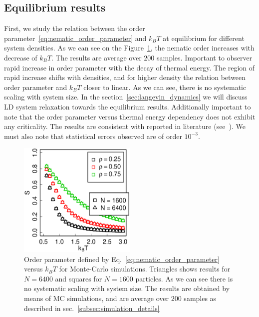 \subsection{Equilibrium results}
\label{subsec:monte_carlo_results}
First, we study the relation between the order parameter~\eqref{eq:nematic_order_parameter} and $k_BT$ at equilibrium for different system densities. As we can see on the Figure~\ref{fig:op_kbt}, the nematic order increases with decrease of $k_BT$. The results are average over $200$ samples. Important to observer rapid increase in order parameter with the decay of thermal energy. The region of rapid increase shifts with densities, and for higher density the relation between order parameter and $k_BT$ closer to linear. As we can see, there is no systematic scaling with system size. In the section~\ref{sec:langevin_dynamics} we will discuss LD system relaxation towards the equilibrium results. Additionally important to note that the order parameter versus thermal energy dependency does not exhibit any criticality. The results are consistent with reported in literature (see~\cite{Marshall2015}). We must also note that statistical errors observed are of order $10^{-3}$.

\begin{figure}[h]
\centering
	\includegraphics[width=0.5\textwidth]{Images/op_eq}
	\captionsetup{justification=centering, width=0.9\columnwidth}
	\caption{Order parameter defined by Eq.~\eqref{eq:nematic_order_parameter} versus $k_BT$ for Monte-Carlo simulations. Triangles shows results for $N = 6400$ and squares for $N = 1600$ particles. As we can see there is no systematic scaling with system size. The results are obtained by means of MC simulations, and are average over $200$ samples as described in sec.~\ref{subsec:simulation_details}}
	\label{fig:op_kbt}
\end{figure}

